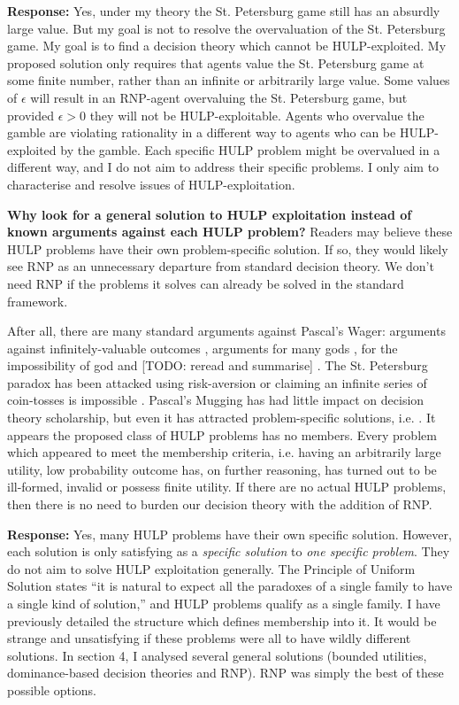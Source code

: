 \documentclass{article}
\begin{document}
\textbf{Response:} Yes, under my theory the St. Petersburg game still has an absurdly large value. But my goal is not to resolve the overvaluation of the St. Petersburg game. My goal is to find a decision theory which cannot be HULP-exploited. My proposed solution only requires that agents value the St. Petersburg game at some finite number, rather than an infinite or arbitrarily large value. Some values of \(\epsilon\) will result in an RNP-agent overvaluing the St. Petersburg game, but provided \(\epsilon>0\) they will not be HULP-exploitable. Agents who overvalue the gamble are violating rationality in a different way to agents who can be HULP-exploited by the gamble. Each specific HULP problem might be overvalued in a different way, and I do not aim to address their specific problems. I only aim to characterise and resolve issues of HULP-exploitation.

\textbf{Why look for a general solution to HULP exploitation instead of known arguments against each HULP problem?} Readers may believe these HULP problems have their own problem-specific solution. If so, they would likely see RNP as an unnecessary departure from standard decision theory. We don't need RNP if the problems it solves can already be solved in the standard framework.

After all, there are many standard arguments against Pascal's Wager: arguments against infinitely-valuable outcomes \citep{mcclennen1994pascal}, arguments for many gods \citep{saka2001pascal}, for the impossibility of god \citep{oppy1991rescher} and [TODO: reread and summarise] \citep{hajek2003waging}. The St. Petersburg paradox has been attacked using risk-aversion \citep{weirich1984st} or claiming an infinite series of coin-tosses is impossible \citep[pg. 154]{jeffrey1990logic}. Pascal's Mugging has had little impact on decision theory scholarship, but even it has attracted problem-specific solutions, i.e. \citep{baumann2009counting}. It appears the proposed class of HULP problems has no members. Every problem which appeared to meet the membership criteria, i.e. having an arbitrarily large utility, low probability outcome has, on further reasoning, has turned out to be ill-formed, invalid or possess finite utility. If there are no actual HULP problems, then there is no need to burden our decision theory with the addition of RNP.

\textbf{Response:} Yes, many HULP problems have their own specific solution. However, each solution is only satisfying as a \textit{specific solution} to \textit{one specific problem}. They do not aim to solve HULP exploitation generally. The Principle of Uniform Solution states ``it is natural to expect all the paradoxes of a single family to have a single kind of solution,'' \citep[pg. 32]{priest1994structure} and HULP problems qualify as a single family. I have previously detailed the structure which defines membership into it. It would be strange and unsatisfying if these problems were all to have wildly different solutions. In section 4, I analysed several general solutions (bounded utilities, dominance-based decision theories and RNP). RNP was simply the best of these possible options. 
\end{document}

